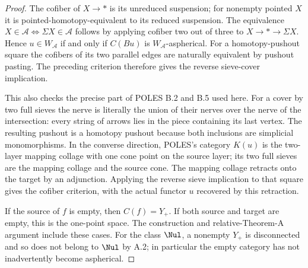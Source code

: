 \begin{proof}
The cofiber of $X\to *$ is its unreduced suspension; for nonempty pointed $X$ it is pointed-homotopy-equivalent to its reduced suspension. The equivalence $X\in\mathcal A\Longleftrightarrow\Sigma X\in\mathcal A$ follows by applying cofiber two out of three to $X\to *\to\Sigma X$. Hence $u\in W_{\mathcal A}$ if and only if $C(Bu)$ is $W_{\mathcal A}$-aspherical. For a homotopy-pushout square the cofibers of its two parallel edges are naturally equivalent by pushout pasting. The preceding criterion therefore gives the reverse sieve-cover implication.

This also checks the precise part of POLES B.2 and B.5 used here. For a cover by two full sieves the nerve is literally the union of their nerves over the nerve of the intersection: every string of arrows lies in the piece containing its last vertex. The resulting pushout is a homotopy pushout because both inclusions are simplicial monomorphisms. In the converse direction, POLES's category $K(u)$ is the two-layer mapping collage with one cone point on the source layer; its two full sieves are the mapping collage and the source cone. The mapping collage retracts onto the target by an adjunction. Applying the reverse sieve implication to that square gives the cofiber criterion, with the actual functor $u$ recovered by this retraction.

If the source of $f$ is empty, then $C(f)=Y_+$. If both source and target are empty, this is the one-point space. The construction and relative-Theorem-A argument include these cases. For the class $\Nul$, a nonempty $Y_+$ is disconnected and so does not belong to $\Nul$ by A.2; in particular the empty category has not inadvertently become aspherical.
\end{proof}

